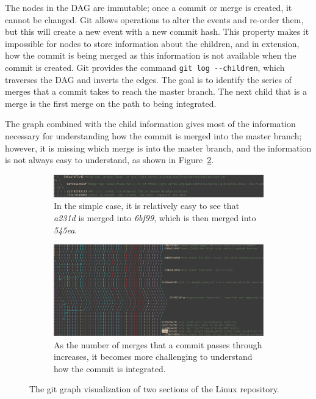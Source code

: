 The nodes in the DAG are immutable; once a commit or merge is created,
it cannot be changed. Git allows operations to alter the events and
re-order them, but this will create a new event with a new commit hash.
This property makes it impossible for nodes to store information about
the children, and in extension, how the commit is being merged as this
information is not available when the commit is created.
Git provides the command \verb|git log --children|, which traverses the
DAG and inverts the edges.
The goal is to identify the series of merges that a commit takes to
reach the master branch.
The next child that is a merge is the first merge on the path to being
integrated.

The graph combined with the child information gives most of the
information necessary for understanding how the commit is
merged into the master branch; however, it is missing which merge is
into the master branch, and the information is not always easy to
understand, as shown in Figure~\ref{fig:git_graphs}.

\begin{figure}[htpb]
  \centering
  \begin{subfigure}[b]{0.8\textwidth}
    \includegraphics[width=\textwidth]{Figures/background/git_graph.png}
    \caption{In the simple case, it is relatively easy to see
      that \textit{a231d} is merged into \textit{6bf99},
      which is then merged into \textit{545ea}.}
    \label{fig:trivial_graph}
  \end{subfigure}

  \begin{subfigure}[b]{0.8\textwidth}
    \includegraphics[width=\textwidth]{Figures/background/git_graph_complex.png}
    \caption{As the number of merges that a commit passes through
      increases, it becomes more challenging to understand how the
      commit is integrated.}
  \end{subfigure}
  \caption{The git graph visualization of two sections of the Linux
    repository.}
  \label{fig:git_graphs}
\end{figure}

